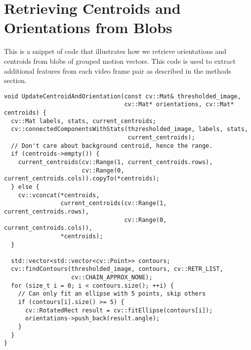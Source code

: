 \chapter{\label{ap:centroids}Retrieving Centroids and Orientations from Blobs}
This is a snippet of code that illustrates how we retrieve orientations and
centroids from blobs of grouped motion vectors. This code is used to extract
additional features from each video frame pair as described in the methods
section. 
\begin{verbatim}
void UpdateCentroidAndOrientation(const cv::Mat& thresholded_image,
                                  cv::Mat* orientations, cv::Mat* centroids) {
  cv::Mat labels, stats, current_centroids;
  cv::connectedComponentsWithStats(thzresholded_image, labels, stats,
                                   current_centroids);
  // Don't care about background centroid, hence the range.
  if (centroids->empty()) {
    current_centroids(cv::Range(1, current_centroids.rows),
                      cv::Range(0, current_centroids.cols)).copyTo(*centroids);
  } else {
    cv::vconcat(*centroids,
                current_centroids(cv::Range(1, current_centroids.rows),
                                  cv::Range(0, current_centroids.cols)),
                *centroids);
  }

  std::vector<std::vector<cv::Point>> contours;
  cv::findContours(thresholded_image, contours, cv::RETR_LIST,
                   cv::CHAIN_APPROX_NONE);
  for (size_t i = 0; i < contours.size(); ++i) {
    // Can only fit an ellipse with 5 points, skip others
    if (contours[i].size() >= 5) {
      cv::RotatedRect result = cv::fitEllipse(contours[i]);
      orientations->push_back(result.angle);
    }
  }
}
\end{verbatim}

